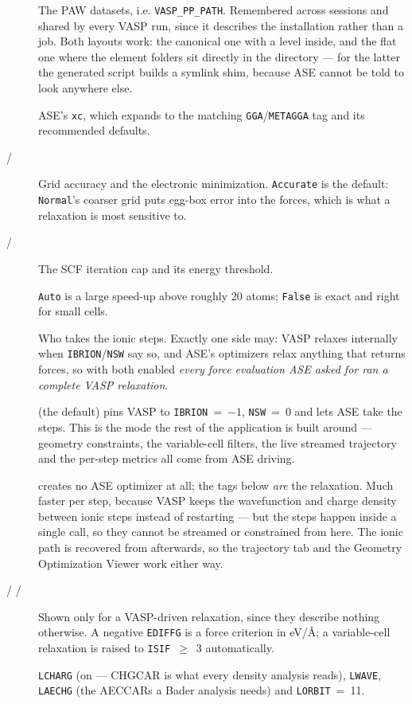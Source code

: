 \begin{description}
  \item[] The PAW datasets, i.e. \texttt{VASP\_PP\_PATH}.
    Remembered across sessions and shared by every VASP run, since it describes
    the installation rather than a job. Both layouts work: the canonical one
    with a  level inside, and the flat one where the element
    folders sit directly in the directory --- for the latter the generated
    script builds a symlink shim, because ASE cannot be told to look anywhere
    else.
  \item[] ASE's \texttt{xc}, which expands to the matching
    \texttt{GGA}/\texttt{METAGGA} tag and its recommended defaults.
  \item[ / ] Grid accuracy and the electronic minimization.
    \texttt{Accurate} is the default: \texttt{Normal}'s coarser grid puts
    egg-box error into the forces, which is what a relaxation is most sensitive
    to.
  \item[ / ] The SCF iteration cap and its energy threshold.
  \item[] \texttt{Auto} is a large speed-up above roughly 20 atoms;
    \texttt{False} is exact and right for small cells.
  \item[] Who takes the ionic steps. Exactly one side
    may: VASP relaxes internally when \texttt{IBRION}/\texttt{NSW} say so, and
    ASE's optimizers relax anything that returns forces, so with both enabled
    \emph{every force evaluation ASE asked for ran a complete VASP
    relaxation}.

     (the default) pins VASP to \texttt{IBRION}~=~$-1$,
    \texttt{NSW}~=~0 and lets ASE take the steps. This is the mode the rest of
    the application is built around --- geometry constraints, the variable-cell
    filters, the live streamed trajectory and the per-step metrics all come
    from ASE driving.

     creates no ASE optimizer at all; the tags
    below \emph{are} the relaxation. Much faster per step, because VASP keeps
    the wavefunction and charge density between ionic steps instead of
    restarting --- but the steps happen inside a single call, so they cannot be
    streamed or constrained from here. The ionic path is recovered from
     afterwards, so the trajectory tab and the Geometry
    Optimization Viewer work either way.
  \item[ /  / ] Shown only for a VASP-driven
    relaxation, since they describe nothing otherwise. A negative \texttt{EDIFFG} is a force criterion in eV/\AA; a
    variable-cell relaxation is raised to \texttt{ISIF}~$\geq$~3
    automatically.
  \item[] \texttt{LCHARG} (on --- CHGCAR is what every density
    analysis reads), \texttt{LWAVE}, \texttt{LAECHG} (the AECCARs a Bader
    analysis needs) and \texttt{LORBIT}~=~11.


\end{description}
